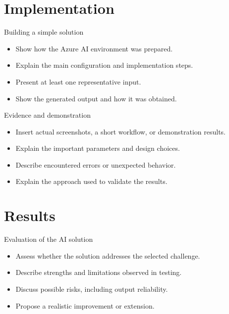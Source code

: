 \documentclass[aspectratio=169,xcolor=dvipsnames]{beamer}
\begin{document}
\section{Implementation}
\begin{frame}{Building a simple solution}
\begin{itemize}
\item Show how the Azure AI environment was prepared.
\item Explain the main configuration and implementation steps.
\item Present at least one representative input.
\item Show the generated output and how it was obtained.
\end{itemize}
\end{frame}
\begin{frame}{Evidence and demonstration}
\begin{itemize}
\item Insert actual screenshots, a short workflow, or demonstration results.
\item Explain the important parameters and design choices.
\item Describe encountered errors or unexpected behavior.
\item Explain the approach used to validate the results.
\end{itemize}
\end{frame}
\section{Results}
\begin{frame}{Evaluation of the AI solution}
\begin{itemize}
\item Assess whether the solution addresses the selected challenge.
\item Describe strengths and limitations observed in testing.
\item Discuss possible risks, including output reliability.
\item Propose a realistic improvement or extension.
\end{itemize}
\end{frame}
\end{document}
